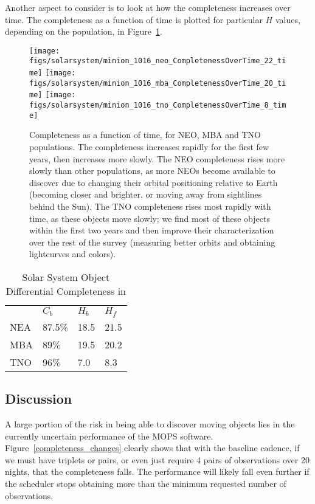 Another aspect to consider is to look at how the completeness
increases over time. The completeness as a function of time is plotted
for particular $H$ values, depending on the
population, in Figure~\ref{completeness_time}.

\begin{figure}
\texttt{[image: figs/solarsystem/minion\_1016\_neo\_CompletenessOverTime\_22\_time]}
\texttt{[image: figs/solarsystem/minion\_1016\_mba\_CompletenessOverTime\_20\_time]}
\texttt{[image: figs/solarsystem/minion\_1016\_tno\_CompletenessOverTime\_8\_time]}
\caption{Completeness as a function of time, for NEO, MBA and TNO
  populations. The completeness increases rapidly for the first few
  years, then increases more slowly. The NEO completeness rises more
  slowly than other populations, as more NEOs become available to
  discover due to changing their orbital positioning relative to Earth
  (becoming closer and brighter, or moving away from sightlines behind
  the Sun). The TNO completeness rises most rapidly with time, as
  these objects move slowly; we find most of these objects within the
  first two years and then improve their characterization over the
  rest of the survey (measuring better orbits and obtaining
  lightcurves and colors).
\label{completeness_time}}
\end{figure}

\begin{table}[]
\centering
\caption{Solar System Object Differential Completeness in }
\label{ssoperf}
\begin{tabular}{llll}
    & $C_b$ & $H_b$ & $H_f$ \\
NEA & 87.5\%  & 18.5  & 21.5  \\
MBA & 89\%  & 19.5  & 20.2  \\
TNO & 96\%  & 7.0   & 8.3
\end{tabular}
\end{table}




\subsection{Discussion}
\label{sec:\secname:discussion}

A large portion of the risk in being able to discover moving objects
lies in the currently uncertain performance of the MOPS
software. Figure~\ref{completeness_changes} clearly shows that with
the baseline cadence, if we must have triplets or pairs, or even just
require 4 pairs of observations over 20 nights, that the completeness
falls. The performance will likely fall even further if the scheduler
stops obtaining more than the minimum requested number of observations.

